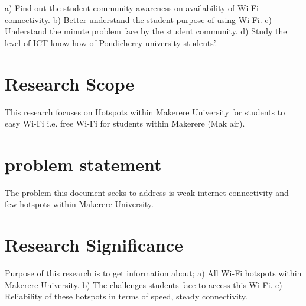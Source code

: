 \documentclass[10]{article}
\begin{document}
a)	Find out the student community awareness on availability of Wi-Fi connectivity.
b)	Better understand the student purpose of using Wi-Fi.
c)	Understand the minute problem face by the student community.
d)	Study the level of ICT know how of Pondicherry university students’.

\section{Research Scope}
This research focuses on Hotspots within Makerere University for students to easy Wi-Fi i.e. free Wi-Fi for students within Makerere (Mak air).

\section{problem statement}
The problem this document seeks to address is weak internet connectivity and few hotspots within Makerere University.

\section{Research Significance}
Purpose of this research is to get information about;
a)	All Wi-Fi hotspots within Makerere University.
b)	The challenges students face to access this Wi-Fi.
c)	Reliability of these hotspots in terms of speed, steady connectivity.
\end{document}
